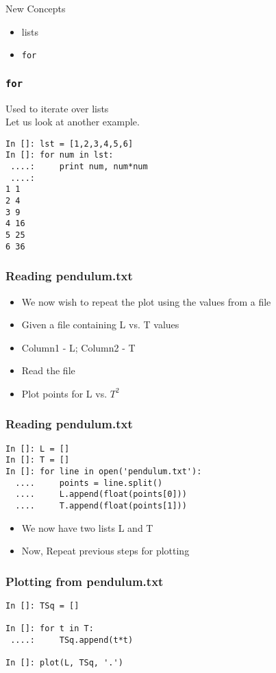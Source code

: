 \documentclass[14pt,compress]{beamer}
\newcommand{\typ}[1]{\lstinline{#1}}
\begin{document}
\begin{frame}{New Concepts}
  \begin{itemize}
    \item lists
    \item \typ{for}
  \end{itemize}
\end{frame}

\begin{frame}[fragile]
\frametitle{\texttt{for}}
Used to iterate over lists\\ Let us look at another example.
\begin{lstlisting}
In []: lst = [1,2,3,4,5,6]
In []: for num in lst:
 ....:     print num, num*num
 ....:    
1 1
2 4
3 9
4 16
5 25
6 36
\end{lstlisting}
\end{frame}

\begin{frame}[fragile]
\frametitle{Reading pendulum.txt}
\begin{itemize}
  \item We now wish to repeat the plot using the values from a file
  \item Given a file containing L vs. T values 
  \item Column1 - L; Column2 - T  
  \item Read the file
  \item Plot points for L vs. $T^2$ 
\end{itemize}
\end{frame}

\begin{frame}[fragile]
\frametitle{Reading pendulum.txt}
\begin{lstlisting}
In []: L = []
In []: T = []
In []: for line in open('pendulum.txt'):
  ....     points = line.split()
  ....     L.append(float(points[0]))
  ....     T.append(float(points[1]))
\end{lstlisting}
\begin{itemize}
\item We now have two lists L and T
\item Now, Repeat previous steps for plotting
\end{itemize}
\end{frame}

\begin{frame}[fragile]
\frametitle{Plotting from pendulum.txt}
\begin{lstlisting}
In []: TSq = []

In []: for t in T:
 ....:     TSq.append(t*t)

In []: plot(L, TSq, '.')
\end{lstlisting}
\end{frame}
\end{document}
